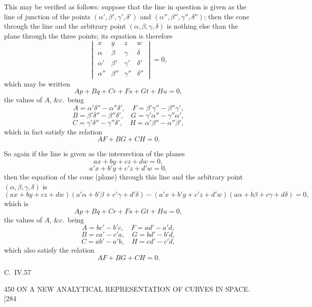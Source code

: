 \documentclass[11pt]{article}
\begin{document}
This may be verified as follows: suppose that the line in question is given as the
line of junction of the points $(\alpha',\beta',\gamma',\delta')$ and
$(\alpha'',\beta'',\gamma'',\delta'')$; then the cone through the line and the
arbitrary point $(\alpha,\beta,\gamma,\delta)$ is nothing else than the plane through
the three points; its equation is therefore
\[ \begin{vmatrix} x & y & z & w \\ \alpha & \beta & \gamma & \delta \\ \alpha' & \beta' & \gamma' & \delta' \\ \alpha'' & \beta'' & \gamma'' & \delta'' \end{vmatrix}=0, \]
which may be written
\[ Ap+Bq+Cr+Fs+Gt+Hu=0, \]
the values of $A$, \&c.\ being
\[ A=\alpha'\delta''-\alpha''\delta',\quad F=\beta'\gamma''-\beta''\gamma', \]
\[ B=\beta'\delta''-\beta''\delta',\quad G=\gamma'\alpha''-\gamma''\alpha', \]
\[ C=\gamma'\delta''-\gamma''\delta',\quad H=\alpha'\beta''-\alpha''\beta', \]
which in fact satisfy the relation
\[ AF+BG+CH=0. \]

So again if the line is given as the intersection of the planes
\[ ax+by+cz+dw=0, \]
\[ a'x+b'y+c'z+d'w=0, \]
then the equation of the cone (plane) through this line and the arbitrary point
$(\alpha,\beta,\gamma,\delta)$ is
\[ (ax+by+cz+dw)(a'\alpha+b'\beta+c'\gamma+d'\delta)-(a'x+b'y+c'z+d'w)(a\alpha+b\beta+c\gamma+d\delta)=0, \]
which is
\[ Ap+Bq+Cr+Fs+Gt+Hu=0, \]
the values of $A$, \&c.\ being
\[ A=bc'-b'c,\quad F=ad'-a'd, \]
\[ B=ca'-c'a,\quad G=bd'-b'd, \]
\[ C=ab'-a'b,\quad H=cd'-c'd, \]
which also satisfy the relation
\[ AF+BG+CH=0. \]

\medskip
\begin{center}C.\ IV.\hfill 57\end{center}

\begin{center}
450 \hfill ON A NEW ANALYTICAL REPRESENTATION OF CURVES IN SPACE. \hfill \textsc{[284}
\end{center}
\end{document}
